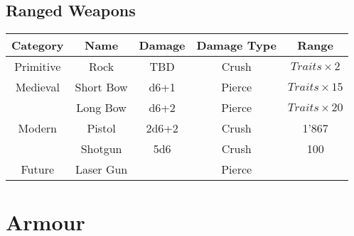 \subsection{Ranged Weapons}
\begin{center}
\begin{tabular}{c | c | c | c | c}
    \textbf{Category} & \textbf{Name} & \textbf{Damage} & \textbf{Damage Type} & \textbf{Range} \\\hline
    Primitive & Rock        &  TBD  & Crush  & $Traits \times 2$ \\\hline
    Medieval  & Short Bow   & d6+1  & Pierce & $Traits \times 15$ \\
              & Long Bow    & d6+2  & Pierce & $Traits \times 20$ \\\hline
    Modern    & Pistol      & 2d6+2 & Crush  & 1'867 \\
              & Shotgun     & 5d6   & Crush  & 100 \\\hline
    Future    & Laser Gun   &       & Pierce & 
\end{tabular}
\end{center}
\section{Armour}